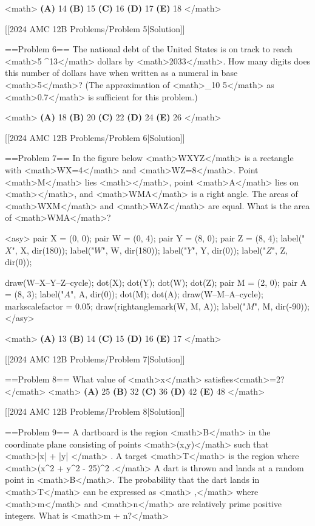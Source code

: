 <math>
\textbf{(A) }14 \qquad
\textbf{(B) }15 \qquad
\textbf{(C) }16 \qquad
\textbf{(D) }17 \qquad
\textbf{(E) }18 \qquad
</math>

[[2024 AMC 12B Problems/Problem 5|Solution]]

==Problem 6==
The national debt of the United States is on track to reach <math>5 ^{13}</math> dollars by <math>2033</math>. How many digits does this number of dollars have when written as a numeral in base <math>5</math>? (The approximation of <math>\log_{10} 5</math> as <math>0.7</math> is sufficient for this problem.)

<math>
\textbf{(A) }18 \qquad
\textbf{(B) }20 \qquad
\textbf{(C) }22 \qquad
\textbf{(D) }24 \qquad
\textbf{(E) }26 \qquad
</math>

[[2024 AMC 12B Problems/Problem 6|Solution]]

==Problem 7==
In the figure below <math>WXYZ</math> is a rectangle with <math>WX=4</math> and <math>WZ=8</math>. Point <math>M</math> lies <math></math>, point <math>A</math> lies on <math></math>, and <math>\angle WMA</math> is a right angle. The areas of <math>\triangle WXM</math> and <math>\triangle WAZ</math> are equal. What is the area of <math>\triangle WMA</math>?

<asy>
pair X = (0, 0);
pair W = (0, 4);
pair Y = (8, 0);
pair Z = (8, 4);
label("$X$", X, dir(180));
label("$W$", W, dir(180));
label("$Y$", Y, dir(0));
label("$Z$", Z, dir(0));

draw(W--X--Y--Z--cycle);
dot(X);
dot(Y);
dot(W);
dot(Z);
pair M = (2, 0);
pair A = (8, 3);
label("$A$", A, dir(0));
dot(M);
dot(A);
draw(W--M--A--cycle);
markscalefactor = 0.05;
draw(rightanglemark(W, M, A));
label("$M$", M, dir(-90));
</asy>

<math>
\textbf{(A) }13 \qquad
\textbf{(B) }14 \qquad
\textbf{(C) }15 \qquad
\textbf{(D) }16 \qquad
\textbf{(E) }17 \qquad
</math>

[[2024 AMC 12B Problems/Problem 7|Solution]]

==Problem 8==
What value of <math>x</math> satisfies<cmath>=2?</cmath>
<math>
\textbf{(A) }25\qquad
\textbf{(B) }32\qquad
\textbf{(C) }36\qquad
\textbf{(D) }42\qquad
\textbf{(E) }48\qquad
</math>

[[2024 AMC 12B Problems/Problem 8|Solution]]

==Problem 9==
A dartboard is the region <math>B</math> in the coordinate plane consisting of points <math>(x,y)</math> such that <math>|x| + |y| </math> . A target <math>T</math> is the region where <math>(x^2 + y^2 - 25)^2 .</math> A dart is thrown and lands at a random point in <math>B</math>. The probability that the dart lands in <math>T</math> can be expressed as <math> \cdot \pi,</math> where <math>m</math> and <math>n</math> are relatively prime positive integers. What is <math>m + n?</math>

